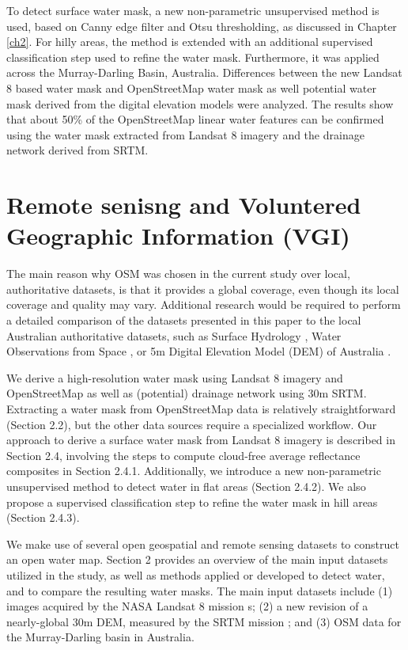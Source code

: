 To detect surface water mask, a new non-parametric unsupervised method is used, based on Canny edge filter and Otsu thresholding, as discussed in Chapter \ref{ch2}. For hilly areas, the method is extended with an additional supervised classification step used to refine the water mask. Furthermore, it was applied across the Murray-Darling Basin, Australia. Differences between the new Landsat 8 based water mask and  OpenStreetMap water mask as well potential water mask derived from the digital elevation models were analyzed. The results show that about 50\% of the OpenStreetMap linear water features can be confirmed using the water mask extracted from Landsat 8 imagery and the drainage network derived from SRTM. 

\section{Remote senisng and Voluntered Geographic Information (VGI)}
The main reason why OSM was chosen in the current study over local, authoritative datasets, is that it provides a global coverage, even though its local coverage and quality may vary. Additional research would be required to perform a detailed comparison of the datasets presented in this paper to the local Australian authoritative datasets, such as Surface Hydrology \citep{CrossmanSLi2015}, Water Observations from Space \citep{Mueller2015}, or 5m Digital Elevation Model (DEM) of Australia \citep{dataAUDEM5m}.

We derive a high-resolution water mask using Landsat 8 imagery and OpenStreetMap as well as (potential) drainage network using 30m SRTM. Extracting a water mask from OpenStreetMap data is relatively straightforward (Section 2.2), but the other data sources require a specialized workflow. Our approach to derive a surface water mask from Landsat 8 imagery is described in Section 2.4, involving the steps to compute cloud-free average reflectance composites in Section 2.4.1. Additionally, we introduce a new non-parametric unsupervised method to detect water in flat areas (Section 2.4.2). We also propose a supervised classification step to refine the water mask in hill areas (Section 2.4.3). 

We make use of several open geospatial and remote sensing datasets to construct an open water map. Section 2 provides an overview of the main input datasets utilized in the study, as well as methods applied or developed to detect water, and to compare the resulting water masks. The main input datasets include (1) images acquired by the NASA Landsat 8 mission \citep{Roy2014}s; (2) a new revision of a nearly-global 30m DEM, measured by the SRTM mission \citep{dataSRTM}; and (3) OSM data for the Murray-Darling basin in Australia. 

